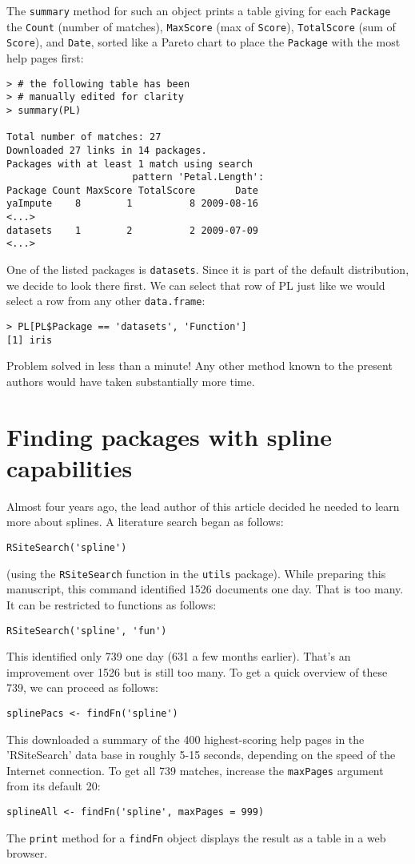 The {\tt summary} method for such an object prints a table giving
for each {\tt Package} the {\tt Count} (number of matches),
{\tt MaxScore} (max of {\tt Score}), {\tt TotalScore} (sum of
{\tt Score}), and {\tt Date}, sorted like a Pareto chart to place
the {\tt Package} with the most help pages first:
\begin{verbatim}
> # the following table has been
> # manually edited for clarity
> summary(PL)

Total number of matches: 27
Downloaded 27 links in 14 packages.
Packages with at least 1 match using search
                      pattern 'Petal.Length':
Package Count MaxScore TotalScore       Date
yaImpute    8        1          8 2009-08-16
<...>
datasets    1        2          2 2009-07-09
<...>
\end{verbatim}
One of the listed packages is {\tt datasets}.  Since it is part of the
default \R{} distribution, we decide to look there first.  We can
select that row of PL just like we would select a row from any other
{\tt data.frame}:
\begin{verbatim}
> PL[PL$Package == 'datasets', 'Function']
[1] iris
\end{verbatim}
Problem solved in less than a minute!  Any other method known
to the present authors would have taken substantially more time.

\section{Finding packages with spline capabilities}

Almost four years ago, the lead author of this article decided he
needed to learn more about splines.  A literature search
began as follows:
\begin{verbatim}
RSiteSearch('spline')
\end{verbatim}
(using the {\tt RSiteSearch} function in the {\tt utils} package).
While preparing this manuscript, this command identified
1526 documents one day.  That is too many.  It can be
restricted to functions as follows:
\begin{verbatim}
RSiteSearch('spline', 'fun')
\end{verbatim}
This identified only 739 one day (631 a few months earlier).
That's an improvement over 1526 but is still too many.
To get a quick overview of these 739, we can proceed
as follows:
\begin{verbatim}
splinePacs <- findFn('spline')
\end{verbatim}
This downloaded a summary of the 400 highest-scoring help pages
in the 'RSiteSearch' data base in roughly 5-15 seconds, depending
on the speed of the Internet connection.  To get all 739 matches,
increase the {\tt maxPages} argument from its default 20:
\begin{verbatim}
splineAll <- findFn('spline', maxPages = 999)
\end{verbatim}
The {\tt print} method for a {\tt findFn} object displays the
result as a table in a web browser.

